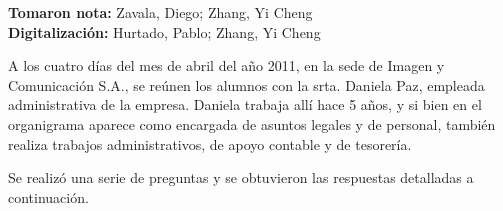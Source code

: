 \documentclass[a4paper,10pt,titlepage]{article}
\begin{document}
\vspace{11cm}

\begin{flushleft}
\textbf{Tomaron nota:} Zavala, Diego; Zhang, Yi Cheng\\
\textbf{Digitalizaci\'on:} Hurtado, Pablo; Zhang, Yi Cheng\\
\end{flushleft}


\newpage


A los cuatro días del mes de abril del a\~no 2011, en la sede de Imagen y Comunicaci\'on S.A., se re\'unen los alumnos con la srta. Daniela Paz, empleada administrativa de la empresa.
Daniela trabaja all\'i hace 5 a\~nos, y si bien en el organigrama aparece como encargada de asuntos legales y de personal, tambi\'en realiza trabajos administrativos, de apoyo contable y de tesorer\'ia.

Se realiz\'o una serie de preguntas y se obtuvieron las respuestas detalladas a continuaci\'on.
\end{document}
